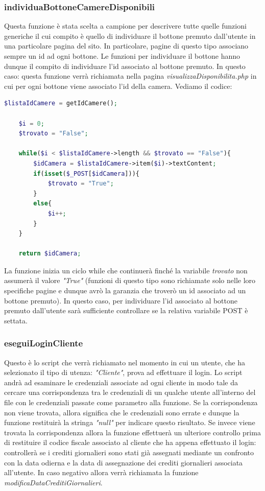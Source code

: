 \documentclass [a4paper, 12pt]{book}
\begin{document}
\subsubsection{individuaBottoneCamereDisponibili}
Questa funzione è stata scelta a campione per descrivere tutte quelle funzioni generiche il cui compito è quello di individuare il bottone premuto dall'utente in una particolare pagina del sito. In particolare, pagine di questo tipo associano sempre un id ad ogni bottone. Le funzioni per individuare il bottone hanno dunque il compito di individuare l'id associato al bottone premuto. In questo caso: questa funzione verrà richiamata nella pagina \textit{visualizzaDisponibilita.php} in cui per ogni bottone viene associato l'id della camera. Vediamo il codice:
\begin{lstlisting}[style=XML , language=PHP]
    $listaIdCamere = getIdCamere();

    $i = 0;
    $trovato = "False";

    while($i < $listaIdCamere->length && $trovato == "False"){
        $idCamera = $listaIdCamere->item($i)->textContent;
        if(isset($_POST[$idCamera])){
            $trovato = "True";
        }
        else{
            $i++;
        }
    }

    return $idCamera;
\end{lstlisting}
La funzione inizia un ciclo while che continuerà finché la variabile \textit{trovato} non assumerà il valore \textit{"True"} (funzioni di questo tipo sono richiamate solo nelle loro specifiche pagine e dunque avrò la garanzia che troverò un id associato ad un bottone premuto). In questo caso, per individuare l'id associato al bottone premuto dall'utente sarà sufficiente controllare se la relativa variabile POST è settata.

\subsubsection{eseguiLoginCliente}
Questo è lo script che verrà richiamato nel momento in cui un utente, che ha selezionato il tipo di utenza: \textit{"Cliente"}, prova ad effettuare il login. Lo script andrà ad esaminare le credenziali associate ad ogni cliente in modo tale da cercare una corrispondenza tra le credenziali di un qualche utente all'interno del file  con le credenziali passate come parametro alla funzione. Se la corrispondenza non viene trovata, allora significa che le credenziali sono errate e dunque la funzione restituirà la stringa \textit{"null"} per indicare questo risultato. Se invece viene trovata la corrispondenza allora la funzione effettuerà un ulteriore controllo prima di restituire il codice fiscale associato al cliente che ha appena effettuato il login:  controllerà se i crediti giornalieri sono stati già assegnati mediante un confronto con la data odierna e la data di assegnazione dei crediti giornalieri associata all'utente. In caso negativo allora verrà richiamata la funzione \textit{modificaDataCreditiGiornalieri}.
\end{document}
